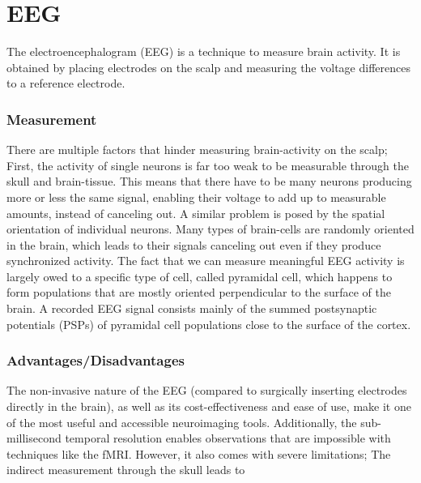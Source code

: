 \section{EEG}\label{sec:eeg}
The electroencephalogram (EEG) is a technique to measure brain activity.
It is obtained by placing electrodes on the scalp and measuring the voltage differences to a reference electrode.

\subsubsection{Measurement}\label{subsubsec:measurement}
There are multiple factors that hinder measuring brain-activity on the scalp;
First, the activity of single neurons is far too weak to be measurable through the skull and brain-tissue.
This means that there have to be many neurons producing more or less the same signal,
enabling their voltage to add up to measurable amounts, instead of canceling out.
A similar problem is posed by the spatial orientation of individual neurons.
Many types of brain-cells are randomly oriented in the brain,
which leads to their signals canceling out even if they produce synchronized activity.
The fact that we can measure meaningful EEG activity is largely owed to a specific type of cell,
called pyramidal cell,
which happens to form populations that are mostly oriented perpendicular to the surface of the brain.
A recorded EEG signal consists mainly of the summed postsynaptic potentials (PSPs) of pyramidal cell populations
close to the surface of the cortex.
\cite[9--20]{mecarelli_clinical_2019}

\subsubsection{Advantages/Disadvantages}\label{subsubsec:advantages/disadvantages}
The non-invasive nature of the EEG (compared to surgically inserting electrodes directly in the brain),
as well as its cost-effectiveness and ease of use,
make it one of the most useful and accessible neuroimaging tools.
Additionally, the sub-millisecond temporal resolution enables observations that are impossible with techniques like
the fMRI.
However, it also comes with severe limitations;
The indirect measurement through the skull leads to
\qquad {}

